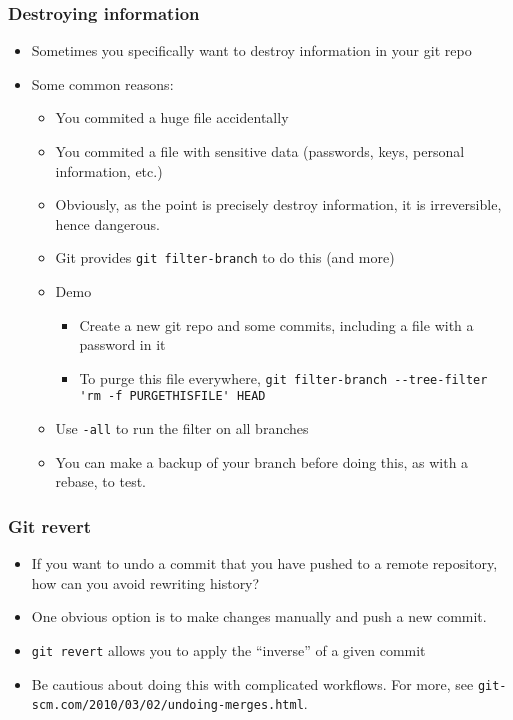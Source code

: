 \documentclass{beamer}
\begin{document}
\begin{frame}[fragile]
\frametitle{Destroying information}
\begin{itemize}
\item Sometimes you specifically want to destroy information in your git repo
\item Some common reasons:
\begin{itemize}
\item You commited a huge file accidentally
\item You commited a file with sensitive data (passwords, keys, personal information, etc.)
\item Obviously, as the point is precisely destroy information, it is irreversible, hence dangerous.
\item Git provides \lstinline{git filter-branch} to do this (and more)
\item Demo
\begin{itemize}
\item Create a new git repo and some commits, including a file with a password in it
\item To purge this file everywhere, \lstinline{git filter-branch --tree-filter 'rm -f PURGETHISFILE' HEAD}
\end{itemize}
\item Use \texttt{-all} to run the filter on all branches
\item You can make a backup of your branch before doing this, as with a rebase, to test.
\end{itemize}
\end{itemize}
\end{frame}

\begin{frame}[fragile]
\frametitle{Git revert}
\begin{itemize}
\item If you want to undo a commit that you have pushed to a remote repository, how can you avoid rewriting history?
\item One obvious option is to make changes manually and push a new commit.
\item \lstinline{git revert} allows you to apply the ``inverse'' of a given commit
\item Be cautious about doing this with complicated workflows. For more, see \texttt{git-scm.com/2010/03/02/undoing-merges.html}.
\end{itemize}
\end{frame}
\end{document}

